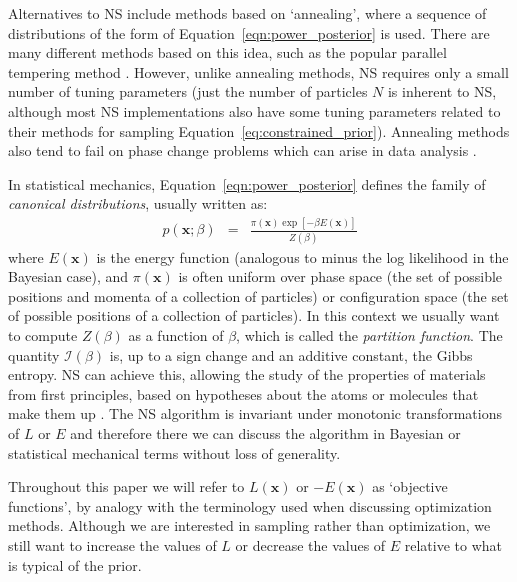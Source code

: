 \documentclass[journal,article,accept,moreauthors,pdftex,12pt,a4paper]{mdpi}
\newcommand{\xx}{\boldsymbol{x}}
\begin{document}
Alternatives to NS include methods based on `annealing', where a sequence of
distributions of the form of Equation~\ref{eqn:power_posterior} is used.
There are many different methods based on this idea, such as the popular
parallel tempering method \citep{pt}.
However, unlike annealing methods, NS requires only a small number of
tuning parameters (just the number of particles $N$ is inherent to NS, although
most NS implementations also have some tuning parameters related to their
methods for sampling Equation~\ref{eq:constrained_prior}). Annealing methods
also tend to fail on phase change problems \citep{skilling} which can arise
in data analysis \citep{rjobject, exoplanet}.

In statistical mechanics, Equation~\ref{eqn:power_posterior} defines the
family of {\it canonical distributions}, usually written as:
\begin{eqnarray}
p(\xx; \beta) &=& \frac{\pi(\xx)\exp[-\beta E(\xx)]}{Z(\beta)}
\end{eqnarray}
where $E(\xx)$ is the energy function (analogous to minus the log likelihood
in the Bayesian case), and $\pi(\xx)$ is often uniform over
phase space (the set of possible positions and momenta of a collection of
particles) or configuration space (the set of possible positions of a collection
of particles). In this context we usually want to
compute $Z(\beta)$ as a function of $\beta$, which is called the
{\it partition function}. The quantity $\mathcal{I}(\beta)$ is, up to a sign
change and an additive constant, the Gibbs entropy.
NS can achieve this, allowing the study of
the properties of materials from first principles, based on hypotheses about
the atoms or molecules that make them up \citep[e.g.][]{2009arXiv0906.3544P,
2014PhRvE..89b2302P, 2015arXiv150303404B}. The NS algorithm is invariant under
monotonic transformations of $L$ or $E$ and therefore there we can discuss the
algorithm in Bayesian or statistical mechanical terms without loss of
generality.

Throughout this paper we will refer to $L(\xx)$ or
$-E(\xx)$ as `objective functions',
by analogy with the terminology used when
discussing optimization methods. Although we are interested in sampling rather
than optimization, we still want to increase the values of $L$ or decrease
the values of $E$ relative to what is typical of the prior.
\end{document}
